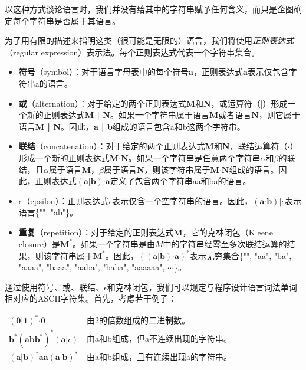 \documentclass[cn,11pt,chinese]{elegantbook}
\begin{document}
以这种方式谈论语言时，我们并没有给其中的字符串赋予任何含义，而只是企图确定每个字符串是否属于其语言。

为了用有限的描述来指明这类（很可能是无限的）语言，我们将使用\textit{正则表达式}（regular expression）表示法。每个正则表达式代表一个字符串集合。

\begin{itemize}
  \item \textbf{符号}（symbol）：对于语言字母表中的每个符号\textbf{a}，正则表达式\textbf{a}表示仅包含字符串a的语言。
  \item \textbf{或}（alternation）：对于给定的两个正则表达式\textbf{M}和\textbf{N}，或运算符（|）形成一个新的正则表达式\textbf{M | N}。如果一个字符串属于语言\textbf{M}或者语言\textbf{N}，则它属于语言\textbf{M | N}。因此，\textbf{a | b}组成的语言包含a和b这两个字符串。
  \item \textbf{联结}（concatenation）：对于给定的两个正则表达式\textbf{M}和\textbf{N}，联结运算符（$\boldsymbol{\cdot}$）形成一个新的正则表达式$\textbf{M}\boldsymbol{\cdot}\textbf{N}$。如果一个字符串是任意两个字符串$\alpha$和$\beta$的联结，且$\alpha$属于语言\textbf{M}，$\beta$属于语言\textbf{N}，则该字符串属于$\textbf{M}\boldsymbol{\cdot}\textbf{N}$组成的语言。因此，正则表达式$(\textbf{a} | \textbf{b})\boldsymbol{\cdot} \textbf{a}$定义了包含两个字符串aa和ba的语言。
  \item $\epsilon$（epsilon）：正则表达式$\epsilon$表示仅含一个空字符串的语言。因此，$(\textbf{a}\boldsymbol{\cdot}\textbf{b})|\epsilon$表示语言\{"", "ab"\}。
  \item \textbf{重复}（repetition）：对于给定的正则表达式\textbf{M}，它的克林闭包（Kleene closure）是$\textbf{M}^*$。如果一个字符串是由$M$中的字符串经零至多次联结运算的结果，则该字符串属于$\textbf{M}^*$。因此，$((\textbf{a}|\textbf{b})\boldsymbol{\cdot}\textbf{a})^*$表示无穷集合\{"", "aa", "ba", "aaaa", "baaa", "aaba", "baba", "aaaaaa", $\cdots$\}。
\end{itemize}

通过使用符号、或、联结、$\epsilon$和克林闭包，我们可以规定与程序设计语言词法单词相对应的ASCII字符集。首先，考虑若干例子：

\begin{center}
  \begin{tabular}{ll}
    $(\textbf{0}|\textbf{1})^*\boldsymbol{\cdot}\textbf{0}$ & 由2的倍数组成的二进制数。\\
    $\textbf{b}^*(\textbf{abb}^*)^*(\textbf{a}|\epsilon)$ & 由a和b组成，但a不连续出现的字符串。\\
    $(\textbf{a}|\textbf{b})^*\textbf{aa}(\textbf{a}|\textbf{b})^*$ & 由a和b组成，且有连续出现a的字符串。\\
  \end{tabular}
\end{center}
\end{document}

